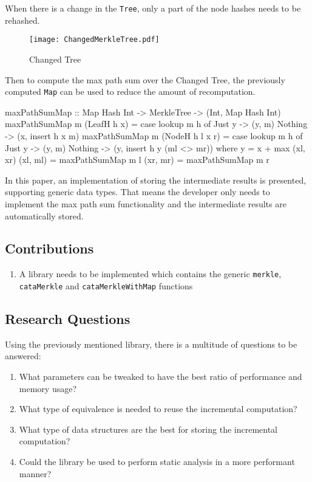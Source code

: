 When there is a change in the \texttt{Tree}, only a part of the node hashes needs to be rehashed.

\begin{figure}[H]
    \centering
    \texttt{[image: ChangedMerkleTree.pdf]}
    \caption{Changed Tree}
\end{figure}

Then to compute the max path sum over the Changed Tree, the previously computed \texttt{Map} can be used to reduce the amount of recomputation.  

\begin{haskell}
maxPathSumMap :: Map Hash Int -> MerkleTree -> (Int, Map Hash Int)
maxPathSumMap m (LeafH h x) = case lookup m h of
  Just y  -> (y, m)
  Nothing -> (x, insert h x m)
maxPathSumMap m (NodeH h l x r) = case lookup m h of
  Just y  -> (y, m)
  Nothing -> (y, insert h y (ml <> mr))
    where
      y = x + max (xl, xr)
      (xl, ml) = maxPathSumMap m l
      (xr, mr) = maxPathSumMap m r  
\end{haskell}

In this paper, an implementation of storing the intermediate results is presented, supporting generic data types. That means the developer only needs to implement the max path sum functionality and the intermediate results are automatically stored.

\subsection{Contributions}
\begin{enumerate}[label={(\Alph*)}]
    \item A library needs to be implemented which contains the generic \texttt{merkle}, \texttt{cataMerkle} and \texttt{cataMerkleWithMap} functions
\end{enumerate}

\subsection{Research Questions}
Using the previously mentioned library, there is a multitude of questions to be answered:
\begin{enumerate}[label={(\Alph*)}]
    \item What parameters can be tweaked to have the best ratio of performance and memory usage?
    \item What type of equivalence is needed to reuse the incremental computation?
    \item What type of data structures are the best for storing the incremental computation?
    \item Could the library be used to perform static analysis in a more performant manner?
\end{enumerate}